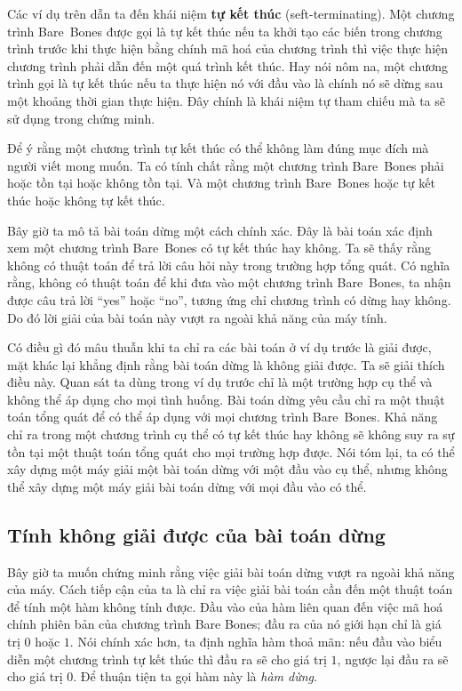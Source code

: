 Các ví dụ trên dẫn ta đến khái niệm \textbf{tự kết thúc} (seft-terminating). Một chương
trình Bare~Bones được gọi là tự kết thúc nếu ta khởi tạo các biến trong chương trình trước
khi thực hiện bằng chính mã hoá của chương trình thì việc thực hiện chương trình phải dẫn
đến một quá trình kết thúc. Hay nói nôm na, một chương trình gọi là tự kết thúc nếu ta
thực hiện nó với đầu vào là chính nó sẽ dừng sau một khoảng thời gian thực hiện. Đây chính
là khái niệm tự tham chiếu mà ta sẽ sử dụng trong chứng minh.

Để ý rằng một chương trình tự kết thúc có thể không làm đúng mục đích mà người viết mong
muốn. Ta có tính chất rằng một chương trình Bare~Bones phải hoặc tồn tại hoặc không tồn
tại. Và một chương trình Bare~Bones hoặc tự kết thúc hoặc không tự kết thúc.

Bây giờ ta mô tả bài toán dừng một cách chính xác. Đây là bài toán xác định xem một chương
trình Bare~Bones có tự kết thúc hay không. Ta sẽ thấy rằng không có thuật toán để trả lời
câu hỏi này trong trường hợp tổng quát. Có nghĩa rằng, không có thuật toán để khi đưa vào
một chương trình Bare~Bones, ta nhận được câu trả lời ``yes'' hoặc ``no'', tương ứng chỉ
chương trình có dừng hay không. Do đó lời giải của bài toán này vượt ra ngoài khả năng của
máy tính.

Có điều gì đó mâu thuẫn khi ta chỉ ra các bài toán ở ví dụ trước là giải được, mặt khác
lại khẳng định rằng bài toán dừng là không giải được. Ta sẽ giải thích điều này. Quan sát
ta dùng trong ví dụ trước chỉ là một trường hợp cụ thể và không thể áp dụng cho mọi tình
huống. Bài toán dừng yêu cầu chỉ ra một thuật toán tổng quát để có thể áp dụng với mọi
chương trình Bare~Bones. Khả năng chỉ ra trong một chương trình cụ thể có tự kết thúc hay
không sẽ không suy ra sự tồn tại một thuật toán tổng quát cho mọi trường hợp được. Nói tóm
lại, ta có thể xây dựng một máy giải một bài toán dừng với một đầu vào cụ thể, nhưng không
thể xây dựng một máy giải bài toán dừng với mọi đầu vào có thể.

\subsection*{Tính không giải được của bài toán dừng}

Bây giờ ta muốn chứng minh rằng việc giải bài toán dừng vượt ra ngoài khả năng của
máy. Cách tiếp cận của ta là chỉ ra việc giải bài toán cần đến một thuật toán để tính một
hàm không tính được. Đầu vào của hàm liên quan đến việc mã hoá chính phiên bản của chương
trình Bare Bones; đầu ra của nó giới hạn chỉ là giá trị $0$ hoặc $1$.  Nói chính xác hơn,
ta định nghĩa hàm thoả mãn: nếu đầu vào biểu diễn một chương trình tự kết thúc thì đầu ra
sẽ cho giá trị $1$, ngược lại đầu ra sẽ cho giá trị $0$. Để thuận tiện ta gọi hàm này là
\textit{hàm dừng}.


